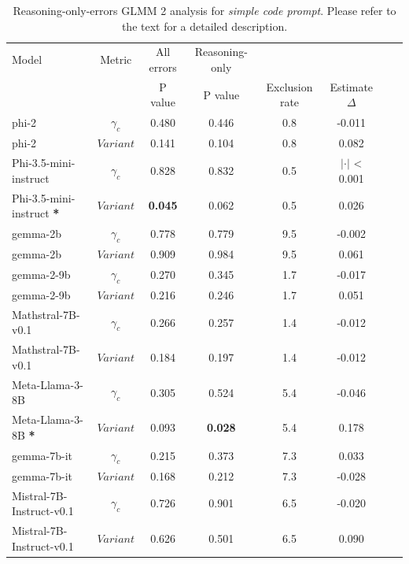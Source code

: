 \documentclass[11pt]{article}
\begin{document}
\begin{table}[H]
\small
\centering
\begin{tabular}{lc|cc|cc|cc}
\toprule
Model & Metric & All errors & Reasoning-only & \multicolumn{2}{c}{} \\
 &  & P value & P value & Exclusion rate & Estimate $\Delta$ \\
\midrule
phi-2 & $\gamma_c$ & 0.480 & 0.446 & 0.8 & -0.011 \\
phi-2 & $Variant$ & 0.141 & 0.104 & 0.8 & 0.082 \\
Phi-3.5-mini-instruct & $\gamma_c$ & 0.828 & 0.832 & 0.5 & $|\cdot|$ < 0.001 \\
Phi-3.5-mini-instruct \textbf{*} & $Variant$ & \textbf{0.045} & 0.062 & 0.5 & 0.026 \\
gemma-2b & $\gamma_c$ & 0.778 & 0.779 & 9.5 & -0.002 \\
gemma-2b & $Variant$ & 0.909 & 0.984 & 9.5 & 0.061 \\
gemma-2-9b & $\gamma_c$ & 0.270 & 0.345 & 1.7 & -0.017 \\
gemma-2-9b & $Variant$ & 0.216 & 0.246 & 1.7 & 0.051 \\
Mathstral-7B-v0.1 & $\gamma_c$ & 0.266 & 0.257 & 1.4 & -0.012 \\
Mathstral-7B-v0.1 & $Variant$ & 0.184 & 0.197 & 1.4 & -0.012 \\
Meta-Llama-3-8B & $\gamma_c$ & 0.305 & 0.524 & 5.4 & -0.046 \\
Meta-Llama-3-8B \textbf{*} & $Variant$ & 0.093 & \textbf{0.028} & 5.4 & 0.178 \\
gemma-7b-it & $\gamma_c$ & 0.215 & 0.373 & 7.3 & 0.033 \\
gemma-7b-it & $Variant$ & 0.168 & 0.212 & 7.3 & -0.028 \\
Mistral-7B-Instruct-v0.1 & $\gamma_c$ & 0.726 & 0.901 & 6.5 & -0.020 \\
Mistral-7B-Instruct-v0.1 & $Variant$ & 0.626 & 0.501 & 6.5 & 0.090 \\
\bottomrule
\end{tabular}
\caption{Reasoning-only-errors GLMM 2 analysis for \textit{simple code prompt}. Please refer to the text for a detailed description.}
\label{tab:clean-glmm2-short-code}
\end{table}
\end{document}
